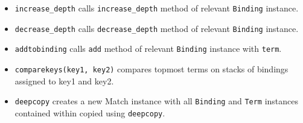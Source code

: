 \begin{itemize}
\item
\texttt{increase\_depth} calls \texttt{increase\_depth} method of relevant \texttt{Binding} instance.

\item
\texttt{decrease\_depth} calls \texttt{decrease\_depth} method of relevant \texttt{Binding} instance.

\item
\texttt{addtobinding} calls \texttt{add} method of relevant \texttt{Binding} instance with \texttt{term}.

\item
\texttt{comparekeys(key1, key2)} compares topmost terms on stacks of bindings assigned to key1 and key2.

\item
	\texttt{deepcopy} creates a new Match instance with all \texttt{Binding} and \texttt{Term} instances contained within copied using \texttt{deepcopy}.
\end{itemize}
